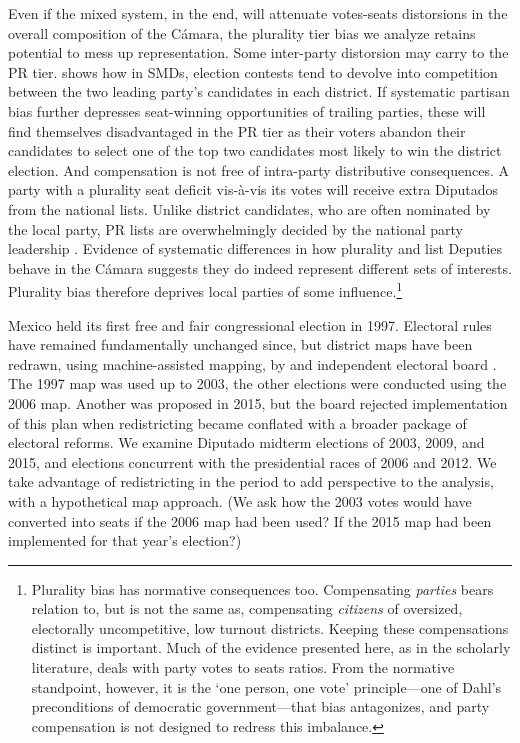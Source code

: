 \documentclass[letter,12pt]{article}
\begin{document}
Even if the mixed system, in the end, will attenuate votes-seats distorsions in the overall composition of the C\'amara, the plurality tier bias we analyze retains potential to mess up representation. Some inter-party distorsion may carry to the PR tier. \citet{cox.1997} shows how in SMDs, election contests tend to devolve into competition between the two leading party's candidates in each district. If systematic partisan bias further depresses seat-winning opportunities of trailing parties, these will find themselves disadvantaged in the PR tier as their voters abandon their candidates to select one of the top two candidates most likely to win the district election. And compensation is not free of intra-party distributive consequences. A party with a plurality seat deficit vis-\`a-vis its votes will receive extra Diputados from the national lists. Unlike district candidates, who are often nominated by the local party, PR lists are overwhelmingly decided by the national party leadership \citep{poire.phd.2002}. Evidence of systematic differences in how plurality and list Deputies behave in the C\'amara \citep{kerevelPork2015} suggests they do indeed represent different sets of interests. Plurality bias therefore deprives local parties of some influence.\footnote{Plurality bias has normative consequences too. Compensating \emph{parties} bears relation to, but is not the same as, compensating \emph{citizens} of oversized, electorally uncompetitive, low turnout districts. Keeping these compensations distinct is important. Much of the evidence presented here, as in the scholarly literature, deals with party votes to seats ratios. From the normative standpoint, however, it is the `one person, one vote' principle---one of Dahl's \citeyearpar{dahl.1972} preconditions of democratic government---that bias antagonizes, and party compensation is not designed to redress this imbalance.} 

Mexico held its first free and fair congressional election in 1997. Electoral rules have remained fundamentally unchanged since, but district maps have been redrawn, using machine-assisted mapping, by and independent electoral board \citep{lujambio.vives.2008,trelles.mtz.polygob2012}. The 1997 map was used up to 2003, the other elections were conducted using the 2006 map. Another was proposed in 2015, but the board rejected implementation of this plan when redistricting became conflated with a broader package of electoral reforms. We examine Diputado midterm elections of 2003, 2009, and 2015, and elections concurrent with the presidential races of 2006 and 2012. We take advantage of redistricting in the period to add perspective to the analysis, with a hypothetical map approach. (We ask how the 2003 votes would have converted into seats if the 2006 map had been used? If the 2015 map had been implemented for that year's election?) 
\end{document}
